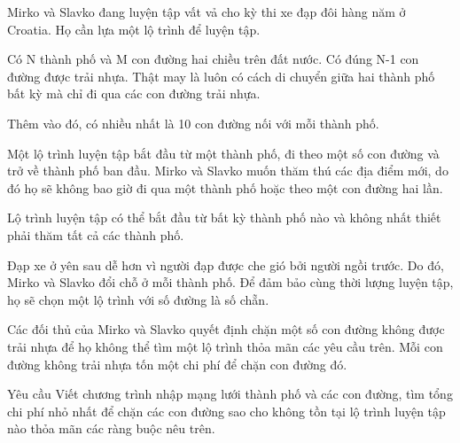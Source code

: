 Mirko và Slavko đang luyện tập vất vả cho kỳ thi xe đạp đôi hàng năm ở Croatia. Họ cần lựa một lộ trình để luyện tập.  

   Có N thành phố và M con đường hai chiều trên đất nước. Có đúng N-1 con đường được trải nhựa. Thật may là luôn có cách di chuyển giữa hai thành phố bất kỳ mà chỉ đi qua các con đường trải nhựa.  

   Thêm vào đó, có nhiều nhất là 10 con đường nối với mỗi thành phố.  

   Một lộ trình luyện tập bắt đầu từ một thành phố, đi theo một số con đường và trở về thành phố ban đầu. Mirko và Slavko muốn thăm thú các địa điểm mới, do đó họ sẽ không bao giờ đi qua một thành phố hoặc theo một con đường hai lần.  

   Lộ trình luyện tập có thể bắt đầu từ bất kỳ thành phố nào và không nhất thiết phải thăm tất cả các thành phố.  

   Đạp xe ở yên sau dễ hơn vì người đạp được che gió bởi người ngồi trước. Do đó, Mirko và Slavko đổi chỗ ở mỗi thành phố. Để đảm bảo cùng thời lượng luyện tập, họ sẽ chọn một lộ trình với số đường là số chẵn.  

   Các đối thủ của Mirko và Slavko quyết định chặn một số con đường không được trải nhựa để họ không thể tìm một lộ trình thỏa mãn các yêu cầu trên. Mỗi con đường không trải nhựa tốn một chi phí để chặn con đường đó.  

Yêu cầu
Viết chương trình nhập mạng lưới thành phố và các con đường, tìm tổng chi phí nhỏ nhất để chặn các con đường sao cho không tồn tại lộ trình luyện tập nào thỏa mãn các ràng buộc nêu trên.